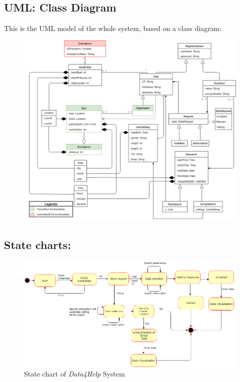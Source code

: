 \subsection{UML: Class Diagram}
This is the UML model of  the whole system, based on a class diagram:
\begin{figure}[H]
    \centering
    \includegraphics[scale=0.4]{Pictures/UML.png}

\end{figure}

\newpage
\subsection{State charts:}

\begin{figure}[H]
    \centering
    \includegraphics[scale=0.4]{Pictures/stateChart1.png}
    \caption{State chart of \emph{Data4Help} System}
\end{figure}

